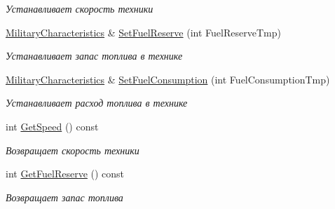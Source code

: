 \begin{DoxyCompactItemize}
\begin{DoxyCompactList}\small\item\em Устанавливает скорость техники \end{DoxyCompactList}\item 
\mbox{\hyperlink{class_aircraft_carrier_group_1_1_military_characteristics}{Military\+Characteristics}} \& \mbox{\hyperlink{class_aircraft_carrier_group_1_1_military_characteristics_a4a3a967ea54b0b01d40fb0ae2db01d14}{Set\+Fuel\+Reserve}} (int Fuel\+Reserve\+Tmp)
\begin{DoxyCompactList}\small\item\em Устанавливает запас топлива в технике \end{DoxyCompactList}\item 
\mbox{\hyperlink{class_aircraft_carrier_group_1_1_military_characteristics}{Military\+Characteristics}} \& \mbox{\hyperlink{class_aircraft_carrier_group_1_1_military_characteristics_a7963f5f29aa9b409819eeb976e0f3456}{Set\+Fuel\+Consumption}} (int Fuel\+Consumption\+Tmp)
\begin{DoxyCompactList}\small\item\em Устанавливает расход топлива в технике \end{DoxyCompactList}\item 
\mbox{\label{class_aircraft_carrier_group_1_1_military_characteristics_a78e91ace73aa0e935bc258154d4a40b8}} 
int \mbox{\hyperlink{class_aircraft_carrier_group_1_1_military_characteristics_a78e91ace73aa0e935bc258154d4a40b8}{Get\+Speed}} () const
\begin{DoxyCompactList}\small\item\em Возвращает скорость техники \end{DoxyCompactList}\item 
\mbox{\label{class_aircraft_carrier_group_1_1_military_characteristics_a4581672300228b600036a3fcc2f823e4}} 
int \mbox{\hyperlink{class_aircraft_carrier_group_1_1_military_characteristics_a4581672300228b600036a3fcc2f823e4}{Get\+Fuel\+Reserve}} () const
\begin{DoxyCompactList}\small\item\em Возвращает запас топлива \end{DoxyCompactList}\item 
\mbox{\label{class_aircraft_carrier_group_1_1_military_characteristics_aa7fe4f3183e2a0da56c381c1805cf8fa}} 

\end{DoxyCompactItemize}
